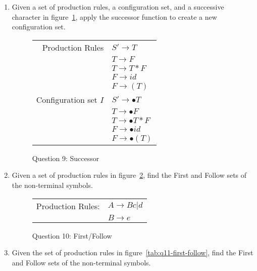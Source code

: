 \documentclass[10pt, oneside, letterpaper]{article}
\begin{document}
\begin{enumerate}
		\clearpage

		\item Given a set of production rules, a configuration set, and a successive character in figure~\ref{tab:q9-successor}, apply the successor function to create a new configuration set.

\begin{figure}[!htb]
	\caption{Question 9: Successor}
	\label{tab:q9-successor}
	\begin{center}
		\begin{tabular}{ r | l }
			Production Rules
			& $S' \rightarrow T$ \\
			& $T \rightarrow F$ \\
			& $T \rightarrow T*F$ \\
			& $F \rightarrow id$ \\
			& $F \rightarrow (T)$ \\
			\hline
			Configuration set $I$
			& $S'\rightarrow \bullet T$ \\
			& $T \rightarrow \bullet F$ \\
			& $T \rightarrow \bullet T * F$ \\
			& $F \rightarrow \bullet id$ \\
			& $F \rightarrow \bullet (T)$ \\
		\end{tabular}
	\end{center}
\end{figure}

		\clearpage
	
		\item Given a set of production rules in figure~\ref{tab:q10-first-follow}, find the First and Follow sets of the non-terminal symbols.

\begin{figure}[!htb]
	\caption{Question 10: First/Follow}
	\label{tab:q10-first-follow}
	\begin{center}
		\begin{tabular}{ r | l }
			Production Rules:
			& $A \rightarrow Bc | d$ \\
			& $B \rightarrow e$ \\
		\end{tabular}
	\end{center}
\end{figure}

		\clearpage
	
		\item Given the set of production rules in figure~\ref{tab:q11-first-follow}, find the First and Follow sets of the non-terminal symbols.


\end{enumerate}
\end{document}
